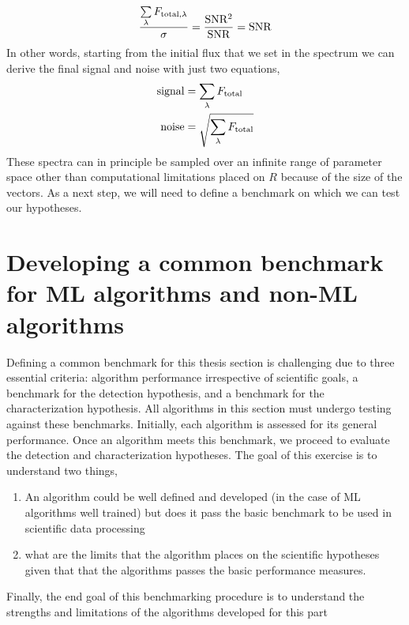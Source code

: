 \begin{equation}
   \dfrac{\sum\limits_{\lambda}F_{\rm{total,\lambda}}}{\sigma}=\rm{\dfrac{SNR^2}{SNR}= SNR }
\end{equation}
In other words, starting from the initial flux that we set in the spectrum we can derive the final signal and noise with just two equations,
\begin{eqnarray}
    \rm{signal} &= \sum\limits_{\lambda}F_{\rm{total}}\\
    \rm{noise} &= \sqrt{\sum\limits_{\lambda}F_{\rm{total}}}\\
\end{eqnarray}
These spectra can in principle be sampled over an infinite range of parameter space other than computational limitations placed on $R$ because of the size of the vectors.
As a next step, we will need to define a benchmark on which we can test our hypotheses.


\section{Developing a common benchmark for ML algorithms and non-ML algorithms}
Defining a common benchmark for this thesis section is challenging due to three essential criteria: algorithm performance irrespective of scientific goals, a benchmark for the detection hypothesis, and a benchmark for the characterization hypothesis. All algorithms in this section must undergo testing against these benchmarks. Initially, each algorithm is assessed for its general performance. Once an algorithm meets this benchmark, we proceed to evaluate the detection and characterization hypotheses.
The goal of this exercise is to understand two things,
\begin{enumerate}
    \item An algorithm could be well defined and developed (in the case of ML algorithms well trained) but does it pass the basic benchmark to be used in scientific data processing
    \item what are the limits that the algorithm places on the scientific hypotheses given that that the algorithms passes the basic performance measures.
\end{enumerate}
Finally, the end goal of this benchmarking procedure is to understand the strengths and limitations of the algorithms developed for this part

